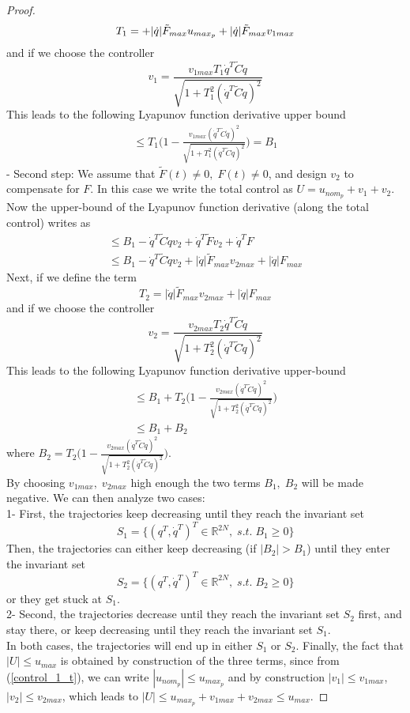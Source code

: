 \documentclass[letterpaper, 11 pt, conference]{ieeeconf}
\begin{document}
\begin{proof}
$$T_{1}=+|\dot{q}|\tilde{F}_{max}u_{max_p}\\+|\dot{q}|\tilde{F}_{max}v_{1max}$$
and if we choose the controller
$$v_{1}=\frac{v_{1max}T_{1}\dot{q}^{T}\tilde{C}\dot{q}}{\sqrt{1+T_{1}^{2}(\dot{q}^{T}\tilde{C}\dot{q})^{2}}}$$
This leads to the following Lyapunov function derivative upper
bound
$$
\begin{array}{l}
\leq
T_{1}\big(1-\frac{v_{1max}(\dot{q}^{T}\tilde{C}\dot{q})^{2}}{\sqrt{1+T_{1}^{2}(\dot{q}^{T}\tilde{C}\dot{q})^{2}}}\big)=B_{1}
\end{array}
$$
- Second step: We assume that $\tilde{F}(t)\neq 0, \;F(t)\neq 0$,
and design $v_{2}$ to compensate for $F$. In this case we write
the total control as $U=u_{nom_p}+v_{1}+v_{2}$. Now the
upper-bound of the Lyapunov function derivative (along the total
control) writes as
$$
\begin{array}{l}
\leq
B_{1}-\dot{q}^{T}\tilde{C}\dot{q}v_{2}+\dot{q}^{T}\tilde{F}v_{2}+\dot{q}^{T}F\\
\leq
B_{1}-\dot{q}^{T}\tilde{C}\dot{q}v_{2}+|\dot{q}|\tilde{F}_{max}v_{2max}+|\dot{q}|F_{max}
\end{array}
$$
Next, if we define the term
$$T_{2}=|\dot{q}|\tilde{F}_{max}v_{2max}+|\dot{q}|F_{max}$$
and if we choose the controller
$$v_{2}=\frac{v_{2max}T_{2}\dot{q}^{T}\tilde{C}\dot{q}}{\sqrt{1+T_{2}^{2}(\dot{q}^{T}\tilde{C}\dot{q})^{2}}}$$
This leads to the following Lyapunov function derivative
upper-bound
$$
\begin{array}{l}
\leq
B_{1}+T_{2}\big(1-\frac{v_{2max}(\dot{q}^{T}\tilde{C}\dot{q})^{2}}{\sqrt{1+T_{2}^{2}(\dot{q}^{T}\tilde{C}\dot{q})^{2}}}\big)\\
\leq B_{1}+B_{2}
\end{array}
$$
where
$B_{2}=T_{2}\big(1-\frac{v_{2max}(\dot{q}^{T}\tilde{C}\dot{q})^{2}}{\sqrt{1+T_{2}^{2}(\dot{q}^{T}\tilde{C}\dot{q})^{2}}}\big)$.
\\
By choosing $v_{1max},\;v_{2max}$ high enough the two terms
$B_{1},\;B_{2}$ will be made negative. We can then analyze two
cases:\\
1- First, the trajectories keep decreasing until they reach the
invariant set
$$S_{1}=\{(q^{T},\dot{q}^{T})^{T}\in\mathbb{R}^{2N},\;s.t.\;B_{1}\geq
0\}$$ Then, the trajectories can either keep decreasing (if
$|B_{2}|>B_{1}$) until they enter the invariant set
$$S_{2}=\{(q^{T},\dot{q}^{T})^{T}\in\mathbb{R}^{2N},\;s.t.\;B_{2}\geq
0\}$$or they get stuck at $S_{1}$.\\
2- Second, the trajectories decrease until they reach the
invariant set $S_{2}$ first, and stay there, or keep decreasing
until they reach the invariant set $S_{1}$.\\In both cases, the
trajectories will end up in either $S_{1}$ or $S_{2}$. Finally,
the fact that $|U|\leq u_{max}$ is obtained by construction of the
three terms, since from (\ref{control_1_t}), we can write
$|u_{nom_p}|\leq u_{max_p}$ and by construction $|v_{1}|\leq
v_{1max}$, $|v_{2}|\leq v_{2max}$, which leads to $|U|\leq
u_{max_p}+v_{1max}+v_{2max}\leq u_{max}$.
\end{proof}
\end{document}
